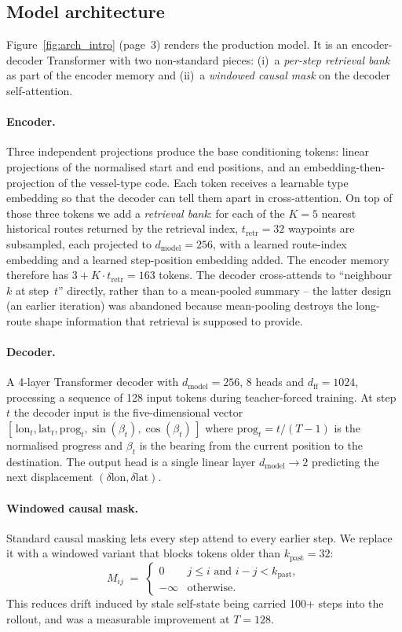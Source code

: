 \documentclass[oneside, a4paper, onecolumn, 11pt]{article}
\begin{document}
\subsection{Model architecture}\label{sec:arch}

Figure~\ref{fig:arch_intro} (page~3) renders the production model.  It
is an encoder-decoder Transformer with two non-standard pieces:
(i)~a \emph{per-step retrieval bank} as part of the encoder memory and
(ii)~a \emph{windowed causal mask} on the decoder self-attention.

\paragraph{Encoder.}
Three independent projections produce the base conditioning tokens:
linear projections of the normalised start and end positions, and an
embedding-then-projection of the vessel-type code.
Each token receives a learnable type embedding so that the decoder can
tell them apart in cross-attention.
On top of those three tokens we add a \emph{retrieval bank}: for each
of the $K = 5$ nearest historical routes returned by the retrieval
index, $t_{\mathrm{retr}} = 32$ waypoints are subsampled, each projected
to $d_{\mathrm{model}} = 256$, with a learned route-index embedding and
a learned step-position embedding added.  The encoder memory therefore
has $3 + K \cdot t_{\mathrm{retr}} = 163$ tokens.
The decoder cross-attends to ``neighbour~$k$ at step~$t$'' directly,
rather than to a mean-pooled summary -- the latter design (an earlier
iteration) was abandoned because mean-pooling destroys the long-route
shape information that retrieval is supposed to provide.

\paragraph{Decoder.}
A 4-layer Transformer decoder with $d_{\mathrm{model}} = 256$,
8 heads and $d_{\mathrm{ff}} = 1024$, processing a sequence of 128
input tokens during teacher-forced training.  At step $t$ the decoder
input is the five-dimensional vector
$[\,\mathrm{lon}_t, \mathrm{lat}_t, \mathrm{prog}_t,
   \sin(\beta_t), \cos(\beta_t)\,]$ where
$\mathrm{prog}_t = t / (T-1)$ is the normalised progress and $\beta_t$
is the bearing from the current position to the destination.  The
output head is a single linear layer $d_{\mathrm{model}} \to 2$
predicting the next displacement $(\delta\mathrm{lon},
\delta\mathrm{lat})$.

\paragraph{Windowed causal mask.}
Standard causal masking lets every step attend to every earlier step.
We replace it with a windowed variant that blocks tokens older than
$k_{\mathrm{past}} = 32$:
\[
  M_{ij} \;=\; \begin{cases}
    0 & j \leq i \text{ and } i - j < k_{\mathrm{past}}, \\
    -\infty & \text{otherwise.}
  \end{cases}
\]
This reduces drift induced by stale self-state being carried 100+ steps
into the rollout, and was a measurable improvement at $T = 128$.
\end{document}
